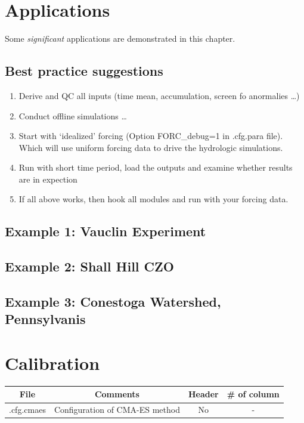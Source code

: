 \documentclass[]{scrbook}
\providecommand{\tightlist}{%
  \setlength{\itemsep}{0pt}\setlength{\parskip}{0pt}}
\begin{document}
\chapter{Applications}\label{applications}

Some \emph{significant} applications are demonstrated in this chapter.

\section{Best practice suggestions}\label{best-practice-suggestions}

\begin{enumerate}
\def\labelenumi{\arabic{enumi}.}
\tightlist
\item
  Derive and QC all inputs (time mean, accumulation, screen fo
  anormalies \ldots{})
\item
  Conduct offline simulations \ldots{}
\item
  Start with `idealized' forcing (Option FORC\_debug=1 in .cfg.para
  file). Which will use uniform forcing data to drive the hydrologic
  simulations.
\item
  Run with short time period, load the outputs and examine whether
  results are in expection
\item
  If all above works, then hook all modules and run with your forcing
  data.
\end{enumerate}

\section{Example 1: Vauclin
Experiment}\label{example-1-vauclin-experiment}

\section{Example 2: Shall Hill CZO}\label{example-2-shall-hill-czo}

\section{Example 3: Conestoga Watershed,
Pennsylvanis}\label{example-3-conestoga-watershed-pennsylvanis}

\chapter{Calibration}\label{calibration}

\begin{longtable}[]{@{}cccc@{}}
\toprule
File & Comments & Header & \# of column\tabularnewline
\midrule
\endhead
.cfg.cmaes & Configuration of CMA-ES method & No & -\tabularnewline
\bottomrule
\end{longtable}
\end{document}

